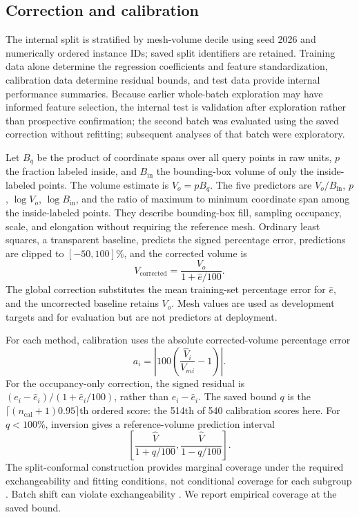 \documentclass[journal]{IEEEtran}
\begin{document}
\subsection{Correction and calibration}

The internal split is stratified by mesh-volume decile using seed 2026 and numerically ordered instance IDs; saved split identifiers are retained. Training data alone determine the regression coefficients and feature standardization, calibration data determine residual bounds, and test data provide internal performance summaries. Because earlier whole-batch exploration may have informed feature selection, the internal test is validation after exploration rather than prospective confirmation; the second batch was evaluated using the saved correction without refitting; subsequent analyses of that batch were exploratory.

Let $B_q$ be the product of coordinate spans over all query points in raw units, $p$ the fraction labeled inside, and $B_{\mathrm{in}}$ the bounding-box volume of only the inside-labeled points. The volume estimate is $V_o=pB_q$. The five predictors are $V_o/B_{\mathrm{in}}$, $p$, $\log V_o$, $\log B_{\mathrm{in}}$, and the ratio of maximum to minimum coordinate span among the inside-labeled points. They describe bounding-box fill, sampling occupancy, scale, and elongation without requiring the reference mesh. Ordinary least squares, a transparent baseline, predicts the signed percentage error, predictions are clipped to $[-50,100]$\%, and the corrected volume is
\begin{equation}
V_{\mathrm{corrected}}=\frac{V_o}{1+\widehat{e}/100}.
\end{equation}
The global correction substitutes the mean training-set percentage error for $\widehat{e}$, and the uncorrected baseline retains $V_o$. Mesh values are used as development targets and for evaluation but are not predictors at deployment.

For each method, calibration uses the absolute corrected-volume percentage error
\begin{equation}
a_i=\left|100\left(\frac{\widehat V_i}{V_{mi}}-1\right)\right|.
\end{equation}
For the occupancy-only correction, the signed residual is $(e_i-\widehat e_i)/(1+\widehat e_i/100)$, rather than $e_i-\widehat e_i$. The saved bound $q$ is the $\lceil(n_{\mathrm{cal}}+1)0.95\rceil$th ordered score: the 514th of 540 calibration scores here. For $q<100$\%, inversion gives a reference-volume prediction interval
\begin{equation}
\left[\frac{\widehat V}{1+q/100},\frac{\widehat V}{1-q/100}\right].
\end{equation}
The split-conformal construction \cite{ref19} provides marginal coverage under the required exchangeability and fitting conditions, not conditional coverage for each subgroup \cite{ref29}. Batch shift can violate exchangeability \cite{ref28}. We report empirical coverage at the saved bound.
\end{document}
